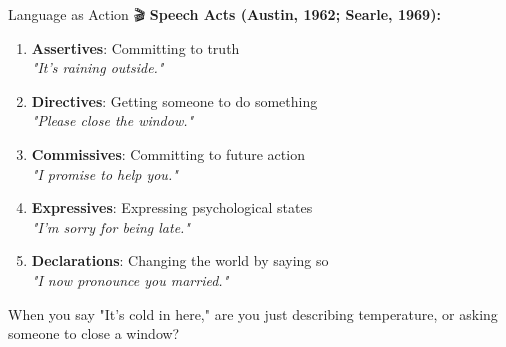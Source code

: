 \documentclass[aspectratio=169]{beamer}
\begin{document}
\begin{frame}{Language as Action 🎬}
\small
    \textbf{Speech Acts (Austin, 1962; Searle, 1969):}

    \vspace{0.3cm}

    \begin{enumerate}\setlength{\itemsep}{0pt}
        \item \textbf{Assertives}: Committing to truth \\
        \textit{"It's raining outside."}

        \item \textbf{Directives}: Getting someone to do something \\
        \textit{"Please close the window."}

        \item \textbf{Commissives}: Committing to future action \\
        \textit{"I promise to help you."}

        \item \textbf{Expressives}: Expressing psychological states \\
        \textit{"I'm sorry for being late."}

        \item \textbf{Declarations}: Changing the world by saying so \\
        \textit{"I now pronounce you married."}
    \end{enumerate}

    \vspace{0.3cm}

    \begin{thinkaboutit}
        When you say "It's cold in here," are you just describing temperature, or asking someone to close a window?
    \end{thinkaboutit}
\end{frame}
\end{document}

